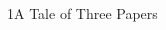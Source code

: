 \documentclass[xcolor=table,9pt,aspectratio=169]{beamer}
\begin{document}
\begin{frame}{\vspace*{10mm}1\hspace*{1em}A Tale of Three Papers}
\vspace*{-5mm}
\begin{multicols}{3}
\begin{center}

\end{center}
\end{multicols}
\end{frame}
\end{document}
